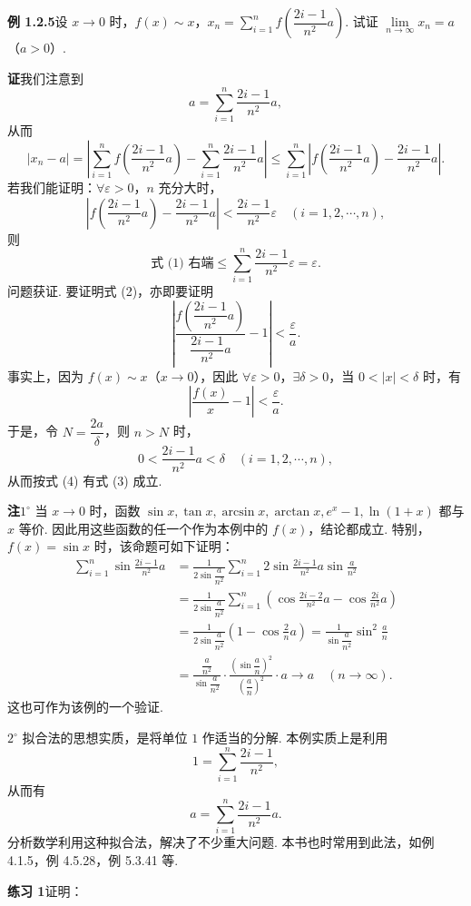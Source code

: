 \documentclass[UTF8, 12pt, fontset=fandol, oneside]{ctexart}
\begin{document}
\noindent\textbf{例 1.2.5}\quad 设 $x\to0$ 时，$f(x)\sim x$，$x_n=\sum\limits_{i=1}^n f\left(\dfrac{2i-1}{n^2}a\right)$. 试证 $\lim\limits_{n\to\infty}x_n=a$（$a>0$）.

\noindent\textbf{证}\quad 我们注意到
\[
  a=\sum_{i=1}^n\frac{2i-1}{n^2}a,
\]
从而
\[
  |x_n-a|
  =\left|\sum_{i=1}^n f\left(\frac{2i-1}{n^2}a\right)
  -\sum_{i=1}^n\frac{2i-1}{n^2}a\right|
  \le \sum_{i=1}^n\left|f\left(\frac{2i-1}{n^2}a\right)-\frac{2i-1}{n^2}a\right|.
\tag{1}
\]
若我们能证明：$\forall\varepsilon>0$，$n$ 充分大时，
\[
  \left|f\left(\frac{2i-1}{n^2}a\right)-\frac{2i-1}{n^2}a\right|
  <\frac{2i-1}{n^2}\varepsilon\quad(i=1,2,\cdots,n),
\tag{2}
\]
则
\[
  \text{式 (1) 右端}\le \sum_{i=1}^n\frac{2i-1}{n^2}\varepsilon=\varepsilon.
\]
问题获证. 要证明式 (2)，亦即要证明
\[
  \left|\frac{f\left(\dfrac{2i-1}{n^2}a\right)}{\dfrac{2i-1}{n^2}a}-1\right|<\frac\varepsilon a.
\tag{3}
\]
事实上，因为 $f(x)\sim x$（$x\to0$），因此 $\forall\varepsilon>0$，$\exists\delta>0$，当 $0<|x|<\delta$ 时，有
\[
  \left|\frac{f(x)}x-1\right|<\frac\varepsilon a.
\tag{4}
\]
于是，令 $N=\dfrac{2a}{\delta}$，则 $n>N$ 时，
\[
  0<\frac{2i-1}{n^2}a<\delta\quad(i=1,2,\cdots,n),
\]
从而按式 (4) 有式 (3) 成立.

\noindent\textbf{注}\quad $1^\circ$ 当 $x\to0$ 时，函数 $\sin x,\tan x,\arcsin x,\arctan x,e^x-1,\ln(1+x)$ 都与 $x$ 等价. 因此用这些函数的任一个作为本例中的 $f(x)$，结论都成立. 特别，$f(x)=\sin x$ 时，该命题可如下证明：
\[
\begin{aligned}
\sum_{i=1}^n\sin\frac{2i-1}{n^2}a
&=\frac1{2\sin\dfrac a{n^2}}\sum_{i=1}^n2\sin\frac{2i-1}{n^2}a\sin\frac a{n^2}\\
&=\frac1{2\sin\dfrac a{n^2}}\sum_{i=1}^n\left(\cos\frac{2i-2}{n^2}a-\cos\frac{2i}{n^2}a\right)\\
&=\frac1{2\sin\dfrac a{n^2}}\left(1-\cos\frac2n a\right)
=\frac1{\sin\dfrac a{n^2}}\sin^2\frac an\\
&=\frac{\dfrac a{n^2}}{\sin\dfrac a{n^2}}\cdot
\frac{\left(\sin\dfrac an\right)^2}{\left(\dfrac an\right)^2}\cdot a
\to a\quad(n\to\infty).
\end{aligned}
\]
这也可作为该例的一个验证.

$2^\circ$ 拟合法的思想实质，是将单位 $1$ 作适当的分解. 本例实质上是利用
\[
  1=\sum_{i=1}^n\frac{2i-1}{n^2},
\]
从而有
\[
  a=\sum_{i=1}^n\frac{2i-1}{n^2}a.
\]
分析数学利用这种拟合法，解决了不少重大问题. 本书也时常用到此法，如例 4.1.5，例 4.5.28，例 5.3.41 等.

\noindent\textbf{练习 1}\quad 证明：
\end{document}
